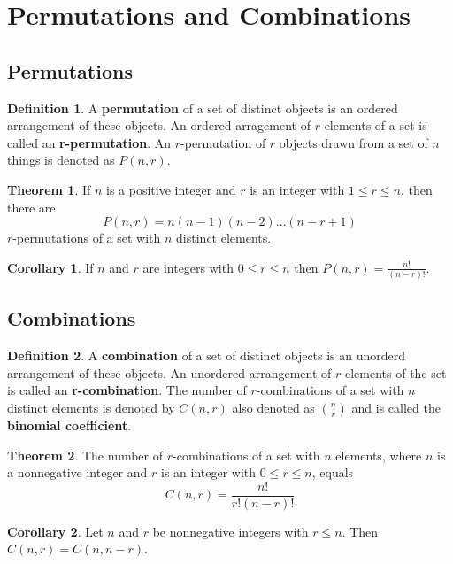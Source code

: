 \documentclass[11pt]{book} %
\theoremstyle {definition}
\newtheorem {definition}{Definition}[section]
\newtheorem {theorem}{Theorem}[section]
\newtheorem {corollary}{Corollary}[section]
\theoremstyle {remark}
\begin{document}
\section {Permutations and Combinations}
   
    \subsection {Permutations}
\begin{definition}
A \textbf{permutation} of a set of distinct objects is an ordered arrangement of these objects. An ordered arragement of $r$ elements of a set is called an \textbf{r-permutation}. An $r$-permutation of $r$ objects drawn from a set of $n$ things is denoted as $P(n,r)$.
\end{definition}

\begin{theorem}
If $n$ is a positive integer and $r$ is an integer with $1 \le r \le n$, then there are 
$$P(n,r) = n(n-1)(n-2) \dots (n-r+1)$$
$r$-permutations of a set with $n$ distinct elements.
\end{theorem}

\begin{corollary}
If $n$ and $r$ are integers with $0 \le r \le n$ then $P(n,r)=\frac{n!}{(n-r)!}$.
\end{corollary}


    \subsection {Combinations}
\begin{definition}
A \textbf{combination} of a set of distinct objects is an unorderd arrangement of these objects. An unordered arrangement of $r$ elements of the set is called an \textbf{r-combination}. The number of $r$-combinations of a set with $n$ distinct elements is denoted by $C(n,r)$ also denoted as $n\choose{r}$ and is called the \textbf{binomial coefficient}.
\end{definition}

\begin{theorem}
The number of $r$-combinations of a set with $n$ elements, where $n$ is a nonnegative integer and $r$ is an integer with $0 \le r \le n$, equals
$$C(n,r)=\frac{n!}{r!(n-r)!}$$
\end{theorem}

\begin{corollary}
Let $n$ and $r$ be nonnegative integers with $r \le n$. Then $C(n,r)=C(n,n-r)$.
\end{corollary}
\end{document}
